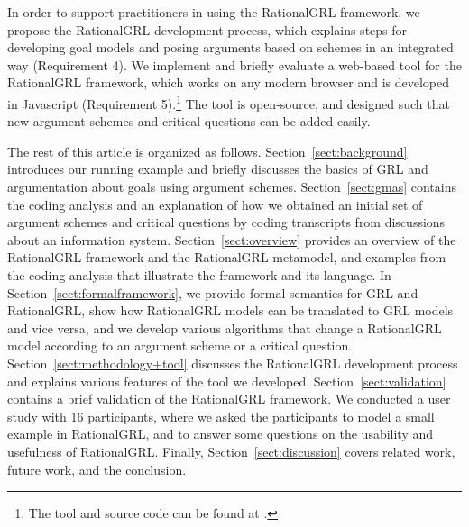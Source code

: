 In order to support practitioners in using the RationalGRL framework, we propose the RationalGRL development process, which explains steps for developing goal models and posing arguments based on schemes in an integrated way (Requirement 4). We implement and briefly evaluate a web-based tool for the RationalGRL framework, which works on any modern browser and is developed in Javascript (Requirement 5).\footnote{The tool and source code can be found at \rationalgrlurl.} The tool is open-source, and designed such that new argument schemes and critical questions can be added easily.

The rest of this article is organized as follows. Section~\ref{sect:background} introduces our running example and briefly discusses the basics of GRL and argumentation about goals using argument schemes. Section~\ref{sect:gmas} contains the coding analysis and an explanation of how we obtained an initial set of argument schemes and critical questions by coding transcripts from discussions about an information system. Section~\ref{sect:overview} provides an overview of the RationalGRL framework and the RationalGRL metamodel, and examples from the coding analysis that illustrate the framework and its language. In Section~\ref{sect:formalframework}, we provide formal semantics for GRL and RationalGRL, show how RationalGRL models can be translated to GRL models and vice versa, and we develop various algorithms that change a RationalGRL model according to an argument scheme or a critical question. Section~\ref{sect:methodology+tool} discusses the RationalGRL development process and explains various features of the tool we developed. Section~\ref{sect:validation} contains a brief validation of the RationalGRL framework. We conducted a user study with 16 participants, where we asked the participants to model a small example in RationalGRL, and to answer some questions on the usability and usefulness of RationalGRL. Finally, Section~\ref{sect:discussion} covers related work, future work, and the conclusion.
